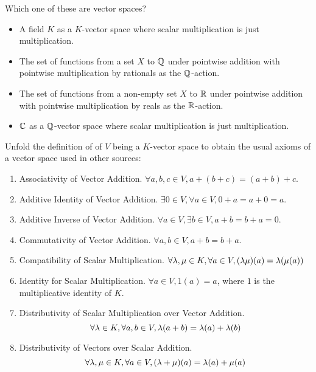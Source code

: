 \documentclass[../../book.tex]{subfiles}
\begin{document}
\begin{ex}
    
    Which one of these are vector spaces? 
    \begin{itemize}
        \item A field $K$ as a $K$-vector space where 
        scalar multiplication is just multiplication. 
        \item The set of functions from a set $X$ to $\mathbb{Q}$ under pointwise addition 
        with pointwise multiplication by rationals as the $\mathbb{Q}$-action.
        \item The set of functions from a non-empty set $X$ to $\mathbb{R}$
        under pointwise addition with 
        pointwise multiplication by reals as the $\mathbb{R}$-action.
        \item $\mathbb{C}$ as a $\mathbb{Q}$-vector space where 
        scalar multiplication is just multiplication.
    \end{itemize}
\end{ex}

\begin{ex}
    
    Unfold the definition of of $V$ being a $K$-vector space to obtain
    the usual axioms of a vector space used in other sources: 
    \begin{enumerate}
        \item Associativity of Vector Addition.
            $\forall a, b, c \in V, a + (b + c) = (a + b) + c$.
        \item Additive Identity of Vector Addition.
            $\exists 0 \in V, \forall a \in V, 0 + a = a + 0 = a$.
        \item Additive Inverse of Vector Addition.
            $\forall a \in V, \exists b \in V, a + b = b + a = 0$. 
        \item Commutativity of Vector Addition.
            $\forall a, b \in V, a + b = b + a$. 
        \item Compatibility of Scalar Multiplication.
            $\forall \lambda, \mu \in K, \forall a \in V, (\lambda\mu)(a) = \lambda(\mu(a))$
        \item Identity for Scalar Multiplication.
            $\forall a \in V, 1(a) = a$,
            where $1$ is the multiplicative identity of $K$.
        \item Distributivity of Scalar Multiplication over Vector Addition.
            \[ 
                \forall \lambda \in K, \forall a, b \in V, \lambda(a + b) = \lambda(a) + \lambda(b)
            \]
        \item Distributivity of Vectors over Scalar Addition.
            \[ 
                \forall \lambda, \mu \in K, 
                \forall a \in V, (\lambda + \mu)(a) = \lambda(a) + \mu(a) 
            \]
    \end{enumerate}
\end{ex}
\end{document}
